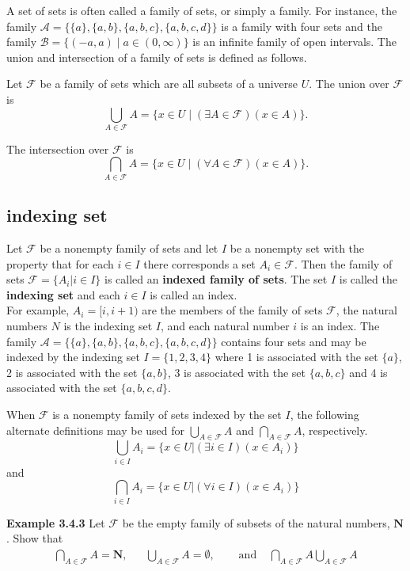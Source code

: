 \documentclass{article}
\begin{document}
    A set of sets is often called a family of sets, or simply a family. For instance, the family $\mathcal{A}=\{\{a\},\{a, b\},\{a, b, c\},\{a, b, c, d\}\}$ is a family with four sets and the family $\mathcal{B}=\{(-a, a) \mid a \in(0, \infty)\}$ is an infinite family of open intervals. The union and intersection of a family of sets is defined as follows.

    Let $\mathcal{F}$ be a family of sets which are all subsets of a universe $U$. The union over $\mathcal{F}$ is
    $$
    \bigcup_{A \in \mathcal{F}} A=\{x \in U \mid(\exists A \in \mathcal{F})(x \in A)\} .
    $$

    The intersection over $\mathcal{F}$ is
    $$
    \bigcap_{A \in \mathcal{F}} A=\{x \in U \mid(\forall A \in \mathcal{F})(x \in A)\} .
    $$
    
    \subsection{indexing set}

    Let $\mathcal{F}$ be a nonempty family of sets and let $I$ be a nonempty set with the property that for each $i \in I$ there corresponds a set $A_i \in \mathcal{F}$. Then the family of sets $\mathcal{F} = \{A_i | i \in I\}$ is called an \textbf{indexed family of sets}. The set $I$ is called the \textbf{indexing set} and each $i \in I$ is called an index. \\
    For example, $A_i = [i,i+1)$ are the members of the family of sets $\mathcal{F}$, the natural numbers $N$ is the indexing set $I$, and each natural number $i$ is an index. The family $\mathcal{A} = \{\{a\},\{a,b\},\{a,b,c\},\{a,b,c,d\}\}$ contains four sets and may be indexed by the indexing set $I = \{1,2,3,4\}$ where 1 is associated with the set $\{a\}$, 2 is associated with the set $\{a,b\}$, 3 is associated with the set $\{a,b,c\}$ and 4 is associated with the set $\{a,b,c,d\}$.

    When $\mathcal{F}$ is a nonempty family of sets indexed by the set $I$, the following alternate definitions may be used for $\bigcup_{A \in \mathcal{F}} A$ and $\bigcap_{A \in \mathcal{F}} A$, respectively.
    $$
    \bigcup_{i \in I} A_i = \{x \in U | (\exists i \in I)(x \in A_i)\}
    $$
    and
    $$
    \bigcap_{i \in I} A_i = \{x \in U | (\forall i \in I)(x \in A_i)\}
    $$

    \textbf{Example 3.4.3} Let $\mathcal{F}$ be the empty family of subsets of the natural numbers, $\mathbf{N}$. Show that \\
    $$
    \begin{aligned}
    \bigcap_{A \in \mathcal{F}} A=\mathbf{N},& & \bigcup_{A \in \mathcal{F}} A=\emptyset, & \quad \textrm{ and } & \bigcap_{A \in \mathcal{F}} A \bigcup_{A \in \mathcal{F}} A
    \end{aligned}
    $$
\end{document}
